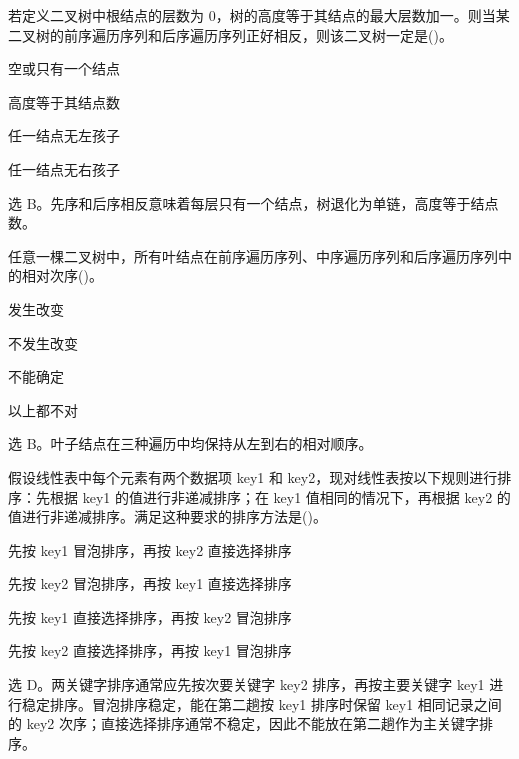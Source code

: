 \begin{question}
若定义二叉树中根结点的层数为 $0$，树的高度等于其结点的最大层数加一。则当某二叉树的前序遍历序列和后序遍历序列正好相反，则该二叉树一定是(\quad)。
\begin{choiceoptions}[2]
  \item 空或只有一个结点
  \item 高度等于其结点数
  \item 任一结点无左孩子
  \item 任一结点无右孩子
\end{choiceoptions}
\begin{solution}
选 B。先序和后序相反意味着每层只有一个结点，树退化为单链，高度等于结点数。
\end{solution}
\end{question}

\begin{question}
任意一棵二叉树中，所有叶结点在前序遍历序列、中序遍历序列和后序遍历序列中的相对次序(\quad)。
\begin{choiceoptions}[2]
  \item 发生改变
  \item 不发生改变
  \item 不能确定
  \item 以上都不对
\end{choiceoptions}
\begin{solution}
选 B。叶子结点在三种遍历中均保持从左到右的相对顺序。
\end{solution}
\end{question}

\begin{question}
假设线性表中每个元素有两个数据项 key1 和 key2，现对线性表按以下规则进行排序：先根据 key1 的值进行非递减排序；在 key1 值相同的情况下，再根据 key2 的值进行非递减排序。满足这种要求的排序方法是(\quad)。
\begin{choiceoptions}[1]
  \item 先按 key1 冒泡排序，再按 key2 直接选择排序
  \item 先按 key2 冒泡排序，再按 key1 直接选择排序
  \item 先按 key1 直接选择排序，再按 key2 冒泡排序
  \item 先按 key2 直接选择排序，再按 key1 冒泡排序
\end{choiceoptions}
\begin{solution}
选 D。两关键字排序通常应先按次要关键字 key2 排序，再按主要关键字 key1 进行稳定排序。冒泡排序稳定，能在第二趟按 key1 排序时保留 key1 相同记录之间的 key2 次序；直接选择排序通常不稳定，因此不能放在第二趟作为主关键字排序。
\end{solution}
\end{question}


